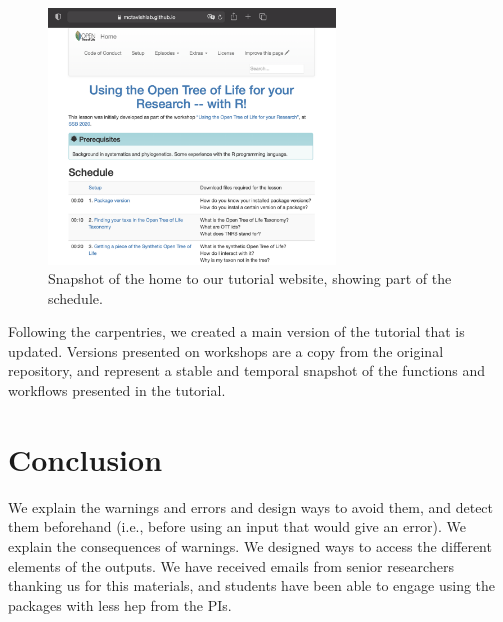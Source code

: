 \documentclass[12pt]{article}
\begin{document}
\begin{figure}
\begin{center}
\includegraphics[width=3in]{fig2.png}
\end{center}
\caption{Snapshot of the home to our tutorial website, showing part of the schedule. \label{fig:second}}
\end{figure}

Following the carpentries, we created a main version of the tutorial that
is updated. Versions presented on workshops are a copy from the original repository,
and represent a stable and temporal snapshot of the functions and workflows presented
in the tutorial.


\section{Conclusion}
\label{sec:conclusion}

We explain the warnings and errors and design ways to avoid them, and detect them
 beforehand (i.e., before using an input that would give an error).
  We explain the consequences of warnings.
We designed ways to access the different elements of the outputs.
We have received emails from senior researchers thanking us for this materials,
 and students have been able to engage using the packages with less hep from the PIs.
\end{document}
